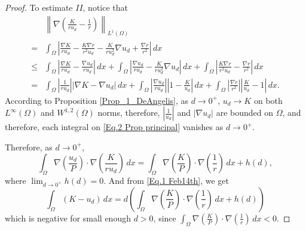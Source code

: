 \documentclass[10pt,a4paper]{amsart}
\newcommand{\module}[1]{\left|#1\right|}
\newcommand{\norm}[1]{\left\|#1\right\|}
\newcommand{\parentheses}[1]{\left(#1\right)}
\begin{document}
\begin{proof}
    To estimate $II$, notice that
	\begin{align}
		\nonumber&\norm{\nabla\parentheses{\frac{K}{r u_d}-\frac{1}{r}}}_{L^1(\Omega)}\\
		\nonumber=&\int_\Omega\module{\frac{\nabla K}{ru_d}-\frac{K\nabla r}{r^2u_d}-\frac{K}{ru_d^2}\nabla u_d+\frac{\nabla r}{r^2}}\,dx\\
		\nonumber\leq&\int_\Omega\module{\frac{\nabla K}{ru_d}-\frac{\nabla u_d}{ru_d}}\,dx+\int_\Omega\module{\frac{\nabla u_d}{ru_d}-\frac{K}{ru_d^2}\nabla u_d}\,dx+\int_\Omega \module{\frac{K\nabla r}{r^2 u_d}-\frac{\nabla r}{r^2}}\,dx\\
		=&\int_\Omega\module{\frac{1}{ru_d}}\module{\nabla K-\nabla u_d}\,dx+\int_\Omega\module{\frac{\nabla u_d}{ru_d}}\module{1-\frac{K}{u_d}}\,dx+\int_\Omega\module{\frac{\nabla r}{r^2}} \module{\frac{K}{u_d}-1}\,dx.\label{Eq.2 Prop principal}
	\end{align}	
According to Proposition \ref{Prop_1_DeAngelis}, as $d\to0^+$, $u_d\to K$ on both $L^\infty(\Omega)$ and $W^{1,2}(\Omega)$ norms, therefore,  $|\frac{1}{u_d}|$ and $|\nabla u_d|$ are bounded on $\Omega$,      and therefore, each integral on \eqref{Eq.2 Prop principal} vanishes as $d\to0^+$.
    

    Therefore, as $d\to0^+$,
    \begin{equation*}
        \int_\Omega\nabla\parentheses{\frac{u_d}{P}}\cdot\nabla\parentheses{\frac{K}{ru_d}}\,dx=\int_\Omega\nabla\parentheses{\frac{K}{P}}\cdot\nabla\parentheses{\frac{1}{r}}\,dx+h(d),
    \end{equation*}
    where $\lim_{d\to0^+}h(d)=0$. And from \eqref{Eq.1 Feb14th}, we get
    \begin{equation*}
        \int_\Omega(K-u_d)\,dx=d\parentheses{\int_\Omega\nabla\parentheses{\frac{K}{P}}\cdot\nabla\parentheses{\frac{1}{r}}\,dx+h(d)}
    \end{equation*}
    which is negative for small enough $d>0$, since $\int_\Omega\nabla\parentheses{\frac{K}{P}}\cdot\nabla\parentheses{\frac{1}{r}}\,dx<0$.
    

\end{proof}
\end{document}
